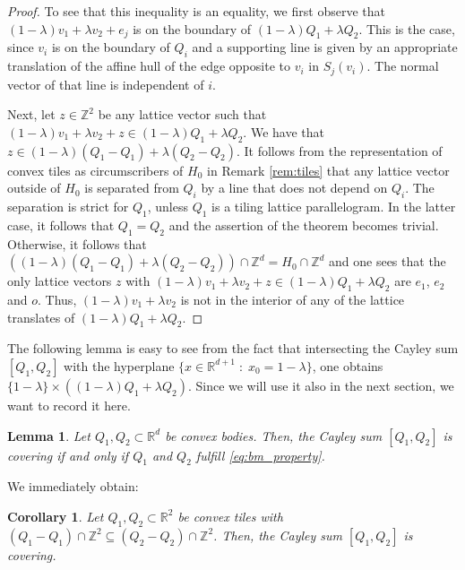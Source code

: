 \documentclass[11pt, a4paper]{amsart}
\newcommand{\RR}{\mathbb{R}}
\newcommand{\ZZ}{\mathbb{Z}}
\newcommand{\origin}{o}
\numberwithin{equation}{section}
\theoremstyle{plain}
\newtheorem{lemma}[theorem]{Lemma}
\newtheorem{corollary}[theorem]{Corollary}
\begin{document}
\begin{proof}
To see that this inequality is an equality, we first observe that $(1-\lambda)v_1 + \lambda v_2 + e_j$ is on the boundary of $(1-\lambda)Q_1 + \lambda Q_2$. This is the case, since $v_i$ is on the boundary of $Q_i$ and a supporting line is given by an appropriate translation of the affine hull of the edge opposite to $v_i$ in $S_j(v_i)$. The normal vector of that line is independent of $i$. 

Next, let $z\in\ZZ^2$ be any lattice vector such that $(1-\lambda)v_1 + \lambda v_2 + z \in (1-\lambda)Q_1 + \lambda Q_2$. We have that $z\in (1-\lambda)(Q_1-Q_1) + \lambda(Q_2-Q_2)$. It follows from the representation of convex tiles as circumscribers of $H_0$ in Remark \ref{rem:tiles} that any lattice vector outside of $H_0$ is separated from $Q_i$ by a line that does not depend on $Q_i$. The separation is strict for $Q_1$, unless $Q_1$ is a tiling lattice parallelogram. In the latter case, it follows that $Q_1=Q_2$ and the assertion of the theorem becomes trivial.
Otherwise, it follows that $((1-\lambda)(Q_1-Q_1) + \lambda(Q_2-Q_2)) \cap \ZZ^d = H_0\cap\ZZ^d$ and one sees that the only lattice vectors $z$ with $(1-\lambda)v_1 + \lambda v_2 + z \in (1-\lambda)Q_1 + \lambda Q_2$ are $e_1$, $e_2$ and $\origin$.
Thus, $(1-\lambda)v_1 + \lambda v_2$ is not in the interior of any of the lattice translates of $(1-\lambda)Q_1 + \lambda Q_2$. 
\end{proof}


The following lemma is easy to see from the fact that intersecting the Cayley sum $[Q_1,Q_2]$ with the hyperplane $\{ x\in \RR^{d+1}\; : \; x_{0}=1-\lambda\}$, one obtains $\{1-\lambda\}\times ((1-\lambda)Q_1+\lambda Q_2)$. Since we will use it also in the next section, we want to record it here. 


\begin{lemma}\label{lem:cayley_covering}
Let $Q_1,Q_2\subset\RR^d$ be convex bodies. Then, the Cayley sum $[Q_1,Q_2]$ is covering if and only if $Q_1$ and $Q_2$ fulfill \eqref{eq:bm_property}.
\end{lemma}

We immediately obtain:

\begin{corollary}\label{cor:planar_cayley_covering}
Let $Q_1,Q_2\subset\RR^2$ be convex tiles with $(Q_1-Q_1)\cap\ZZ^2 \subseteq (Q_2-Q_2)\cap\ZZ^2$. Then, the Cayley sum $[Q_1,Q_2]$ is covering.
\end{corollary}
\end{document}
